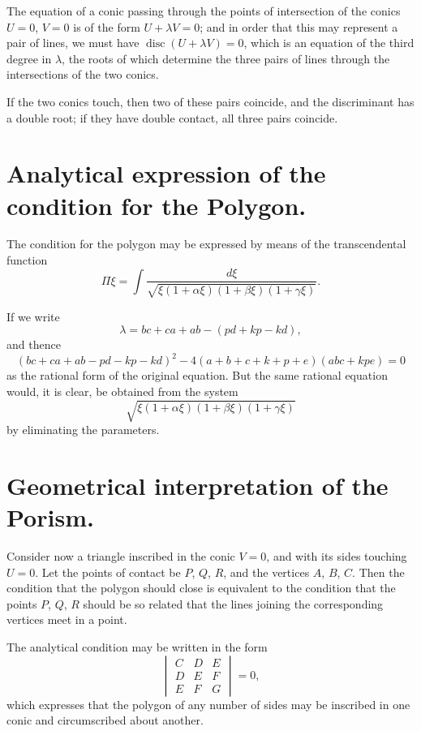 \documentclass[11pt,a4paper]{article}
\theoremstyle{plain}
\theoremstyle{definition}
\theoremstyle{remark}
\DeclareMathOperator{\disc}{disc}
\begin{document}
The equation of a conic passing through the points of intersection of the conics $U=0$, $V=0$ is of the form $U+\lambda V=0$; and in order that this may represent a pair of lines, we must have $\disc(U+\lambda V)=0$, which is an equation of the third degree in $\lambda$, the roots of which determine the three pairs of lines through the intersections of the two conics.

If the two conics touch, then two of these pairs coincide, and the discriminant has a double root; if they have double contact, all three pairs coincide.

\newpage
\setcounter{page}{316}

\section*{Analytical expression of the condition for the Polygon.}

The condition for the polygon may be expressed by means of the transcendental function
\[
\Pi\xi = \int \frac{d\xi}{\sqrt{\xi(1+\alpha\xi)(1+\beta\xi)(1+\gamma\xi)}}.
\]

If we write
\[
\lambda = bc+ca+ab-(pd+kp-kd),
\]
and thence
\[
(bc+ca+ab-pd-kp-kd)^2-4(a+b+c+k+p+e)(abc+kpe)=0
\]
as the rational form of the original equation. But the same rational equation would, it is clear, be obtained from the system
\[
\sqrt{\xi(1+\alpha\xi)(1+\beta\xi)(1+\gamma\xi)}
\]
by eliminating the parameters.

\newpage
\setcounter{page}{317}

\section*{Geometrical interpretation of the Porism.}

Consider now a triangle inscribed in the conic $V=0$, and with its sides touching $U=0$. Let the points of contact be $P$, $Q$, $R$, and the vertices $A$, $B$, $C$. Then the condition that the polygon should close is equivalent to the condition that the points $P$, $Q$, $R$ should be so related that the lines joining the corresponding vertices meet in a point.

The analytical condition may be written in the form
\[
\begin{vmatrix}
C & D & E \\
D & E & F \\
E & F & G
\end{vmatrix} = 0,
\]
which expresses that the polygon of any number of sides may be inscribed in one conic and circumscribed about another.
\end{document}
